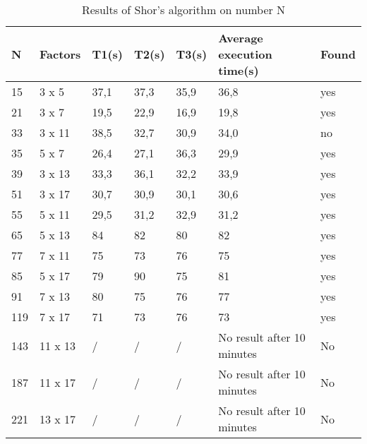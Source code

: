 \begin{table}[h]
\label{tab:quantumresults}
    \caption{Results of Shor's algorithm on number N}
    \begin{tabular}{|l|l|l|l|l|l|l|}
    \hline
    N   & Factors   & T1(s) & T2(s) & T3(s) & Average execution time(s)       & Found              \\ \hline
    15  & 3 x 5   & 37,1  & 37,3  & 35,9  & 36,8                              & yes                \\
    21  & 3 x 7   & 19,5  & 22,9  & 16,9  & 19,8                              & yes                \\
    33  & 3 x 11  & 38,5  & 32,7  & 30,9  & 34,0                              & no                 \\
    35  & 5 x 7   & 26,4  & 27,1  & 36,3  & 29,9                              & yes                \\
    39  & 3 x 13  & 33,3  & 36,1  & 32,2  & 33,9                              & yes                \\
    51  & 3 x 17  & 30,7  & 30,9  & 30,1  & 30,6                              & yes                \\
    55  & 5 x 11  & 29,5  & 31,2  & 32,9  & 31,2                              & yes                \\
    65  & 5 x 13  & 84    & 82    & 80    & 82                                & yes                \\
    77  & 7 x 11  & 75    & 73    & 76    & 75                                & yes                \\
    85  & 5 x 17  & 79    & 90    & 75    & 81                                & yes                \\
    91  & 7 x 13  & 80    & 75    & 76    & 77                                & yes                \\
    119 & 7 x 17  & 71    & 73    & 76    & 73                                & yes                \\
    143 & 11 x 13 & /     & /     & /     & No result after 10 minutes        & No                 \\
    187 & 11 x 17 & /     & /     & /     & No result after 10 minutes        & No                 \\
    221 & 13 x 17 & /     & /     & /     & No result after 10 minutes        & No                 \\ \hline
    \end{tabular}
\end{table}

